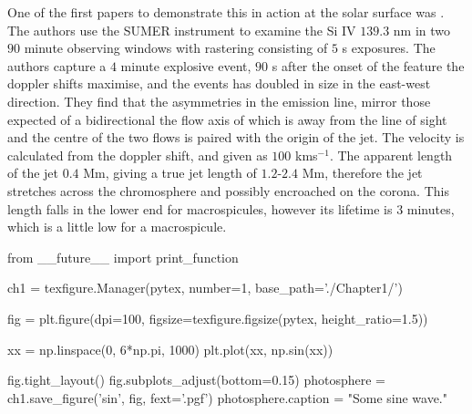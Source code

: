 One of the first papers to demonstrate this in action at the solar surface was \cite{Innes1997}.
The authors use the SUMER instrument to examine the Si IV $139.3$ nm in two $90$ minute observing windows with rastering consisting of $5$ s exposures.
The authors capture a $4$ minute explosive event, $90$ s after the onset of the feature the doppler shifts maximise, and the events has doubled in size in the east-west direction.
They find that the asymmetries in the emission line, mirror those expected of a bidirectional the flow axis of which is away from the line of sight and the centre of the two flows is paired with the origin of the jet.
The velocity is calculated from the doppler shift, and given as $100$ kms$^{-1}$.
The apparent length of the jet $0.4$ Mm, giving a true jet length of $1.2$-$2.4$ Mm, therefore the jet stretches across the chromosphere and possibly encroached on the corona.
This length falls in the lower end for macrospicules, however its lifetime is $3$ minutes, which is a little low for a macrospicule.






















 
































\begin{pycode}[chapter1]
from __future__ import print_function

ch1 = texfigure.Manager(pytex, number=1, base_path='./Chapter1/')
\end{pycode}

\begin{pycode}[chapter1]
fig = plt.figure(dpi=100, figsize=texfigure.figsize(pytex, height_ratio=1.5))

xx = np.linspace(0, 6*np.pi, 1000)
plt.plot(xx, np.sin(xx))

fig.tight_layout()
fig.subplots_adjust(bottom=0.15)
photosphere = ch1.save_figure('sin', fig, fext='.pgf')
photosphere.caption = "Some sine wave."
\end{pycode}


